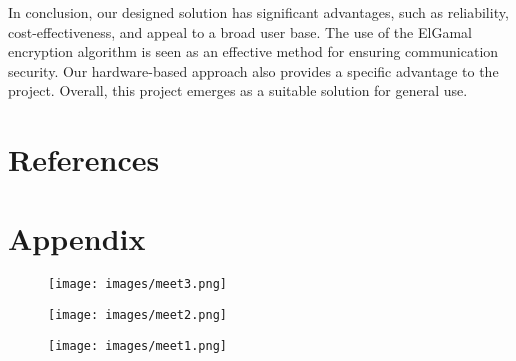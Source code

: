 \documentclass[12pt]{article}
\begin{document}
	In conclusion, our designed solution has significant advantages, such as reliability, cost-effectiveness, and appeal to a broad user base. The use of the ElGamal encryption algorithm is seen as an effective method for ensuring communication security. Our hardware-based approach also provides a specific advantage to the project. Overall, this project emerges as a suitable solution for general use.
	\newpage
	\section{References}




	\newpage
	\section{Appendix}
	\begin{figure}[H]
	\centering
	\label{Meeting1}
	\texttt{[image: images/meet3.png]}\\[0.5 cm]			
\end{figure}
	\begin{figure}[H]
	\centering
	\label{Meeting2}
	\texttt{[image: images/meet2.png]}\\[0.5 cm]			
\end{figure}
	\begin{figure}[H]
	\centering
	\label{Meeting3}
	\texttt{[image: images/meet1.png]}\\[0.5 cm]			
\end{figure}
	
	
\end{document}
